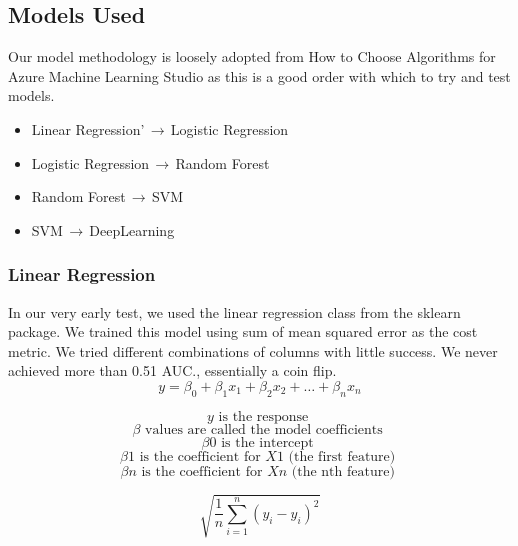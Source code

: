 \documentclass[sigconf]{acmart}
\begin{document}
\subsection{Models Used}
Our model methodology is loosely adopted from How to Choose Algorithms for Azure Machine Learning Studio \cite{order:2019} as this is a good order with which to try and test models.
\begin{itemize}
\item Linear Regression’$\,\to\,$Logistic Regression
\item Logistic Regression$\,\to\,$Random Forest
\item Random Forest$\,\to\,$SVM
\item SVM$\,\to\,$DeepLearning
\end{itemize}
\subsubsection{Linear Regression}
In our very early test, we used the linear regression class from the sklearn package. We trained this model using sum of mean squared error as the cost metric. We tried different combinations of columns with little success. We never achieved more than 0.51 AUC., essentially a coin flip.
\begin{equation}
y=\beta_{0}+\beta_{1} x_{1}+\beta_{2} x_{2}+\ldots+\beta_{n} x_{n}
\end{equation}

\begin{equation}
y \text { is the response }
\end{equation}
\begin{equation}
\beta \text { values are called the model coefficients }
\end{equation}
\begin{equation}
\beta 0 \text { is the intercept }
\end{equation}
\begin{equation}
\beta 1 \text { is the coefficient for } X 1 \text { (the first feature) }
\end{equation}
\begin{equation}
\beta n \text { is the coefficient for } X n \text { (the nth feature) }
\end{equation}

\begin{equation}
\sqrt{\frac{1}{n} \sum_{i=1}^{n}\left(y_{i}-\hat{y}_{i}\right)^{2}}
\end{equation}
\end{document}
